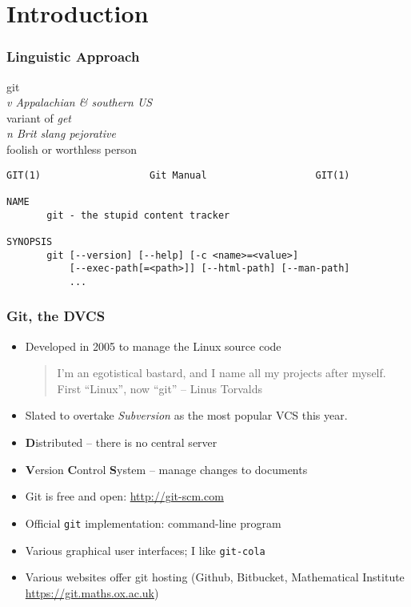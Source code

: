 
\section{Introduction}

\begin{frame}[fragile]
  \frametitle{Linguistic Approach}
  \vspace{-5mm}
  
  \begin{block}{}
    git \\
    \textit{v Appalachian \& southern US}\\
    \hspace{1cm} variant of \emph{get}\\
    \textit{n Brit slang pejorative}\\
    \hspace{1cm} foolish or worthless person
  \end{block}
  \bigskip
  \pause

  \small
\begin{verbatim}
GIT(1)                   Git Manual                   GIT(1)

NAME
       git - the stupid content tracker

SYNOPSIS
       git [--version] [--help] [-c <name>=<value>]
           [--exec-path[=<path>]] [--html-path] [--man-path]
           ...
\end{verbatim}

\end{frame}


\begin{frame}
  \frametitle{Git, the DVCS}

  \begin{itemize}
  \item 
    Developed in 2005 to manage the Linux source code
    \begin{quote}
      I'm an egotistical bastard, and I name all my projects after
      myself. First ``Linux'', now ``git'' -- Linus Torvalds
    \end{quote}
  \item Slated to overtake \emph{Subversion} as the most popular VCS
    this year.
  \item \textbf{D}istributed -- there is no central server
  \item \textbf{V}ersion \textbf{C}ontrol \textbf{S}ystem -- manage
    changes to documents
  \item Git is free and open: \url{http://git-scm.com}
  \item Official \texttt{git} implementation: command-line program
  \item Various graphical user interfaces; I like \texttt{git-cola}
  \item Various websites offer git hosting (Github, Bitbucket,
    Mathematical Institute \url{https://git.maths.ox.ac.uk})
  \end{itemize}

\end{frame}







